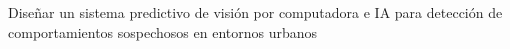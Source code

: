 \begin{center}
	\vspace*{10cm}
	{Diseñar un sistema predictivo de visión por computadora e IA para detección de comportamientos
sospechosos en entornos urbanos}
\end{center}
